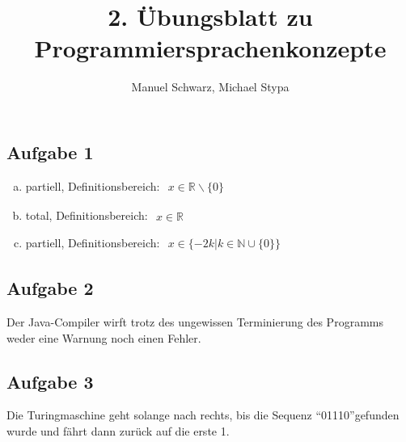 \documentclass[a4paper,12pt]{article}
\title{2. Übungsblatt zu Programmiersprachenkonzepte}
\author{Manuel Schwarz, Michael Stypa}
\begin{document}
\maketitle

\subsection*{Aufgabe 1}
\begin{enumerate}[a)]
  \item partiell, Definitionsbereich:
        $\begin{aligned} x \in \mathbb{R} \backslash \{0\} \end{aligned}$ 
  \item total, Definitionsbereich:
        $\begin{aligned} x \in \mathbb{R} \end{aligned}$
  \item partiell, Definitionsbereich:
        $\begin{aligned} x \in \{-2k | k \in \mathbb{N}\cup\{0\}\}
         \end{aligned}$
\end{enumerate}

\bigskip

\subsection*{Aufgabe 2}
Der Java-Compiler wirft trotz des ungewissen Terminierung des Programms weder
eine Warnung noch einen Fehler.

\bigskip

\newpage

\subsection*{Aufgabe 3}
Die Turingmaschine geht solange nach rechts, bis die Sequenz
\textquotedblleft01110\textquotedblright gefunden wurde
und fährt dann zurück auf die erste 1.

\vspace{5mm}
\end{document}
